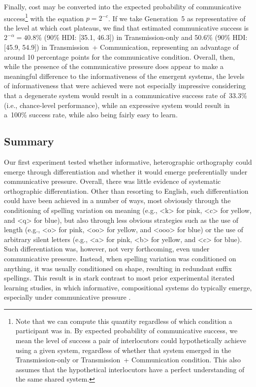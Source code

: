 \documentclass[doc,biblatex]{apa7}
\begin{document}
Finally, cost may be converted into the expected probability of communicative success\footnote{Note that we can compute this quantity regardless of which condition a participant was in. By expected probability of communicative success, we mean the level of success a pair of interlocutors could hypothetically achieve using a given system, regardless of whether that system emerged in the Transmission-only or Transmission~+ Communication condition. This also assumes that the hypothetical interlocutors have a perfect understanding of the same shared system.} with the equation $p=2^{-c}$. If we take Generation~5 as representative of the level at which cost plateaus, we find that estimated communicative success is $2^{-\alpha} = 40.8$\% (90\% HDI: [35.1, 46.3]) in Transmission-only and 50.6\% (90\% HDI: [45.9, 54.9]) in Transmission~+ Communication, representing an advantage of around 10 percentage points for the communicative condition. Overall, then, while the presence of the communicative pressure does appear to make a meaningful difference to the informativeness of the emergent systems, the levels of informativeness that were achieved were not especially impressive considering that a degenerate system would result in a communicative success rate of~33.3\% (i.e., chance-level performance), while an expressive system would result in a~100\% success rate, while also being fairly easy to learn.

\subsection{Summary}

Our first experiment tested whether informative, heterographic orthography could emerge through differentiation and whether it would emerge preferentially under communicative pressure. Overall, there was little evidence of systematic orthographic differentiation. Other than resorting to English, such differentiation could have been achieved in a number of ways, most obviously through the conditioning of spelling variation on meaning (e.g., <k> for pink, <c> for yellow, and <q> for blue), but also through less obvious strategies such as the use of length (e.g., <o> for pink, <oo> for yellow, and <ooo> for blue) or the use of arbitrary silent letters (e.g., <a> for pink, <b> for yellow, and <c> for blue). Such differentiation was, however, not very forthcoming, even under communicative pressure. Instead, when spelling variation was conditioned on anything, it was usually conditioned on shape, resulting in redundant suffix spellings. This result is in stark contrast to most prior experimental iterated learning studies, in which informative, compositional systems do typically emerge, especially under communicative pressure \parencite[e.g.,][]{Kirby:2015}.
\end{document}
